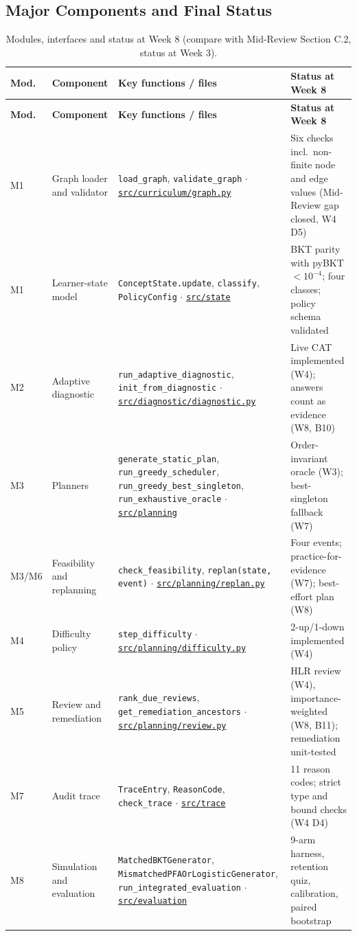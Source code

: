 \documentclass[english]{sintr}
\newcommand{\repourl}{https://github.com/Bhuvan-56/adaptive-learning-path-planner-DAT}
\newcommand{\sha}{cs5903-final-2026}
\DeclareRobustCommand{\rf}[1]{\href{\repourl/blob/\sha/#1}{\nolinkurl{#1}}}
\DeclareRobustCommand{\rd}[1]{\href{\repourl/tree/\sha/#1}{\nolinkurl{#1}}}
\begin{document}
\subsection{Major Components and Final Status}
{\small
\begin{longtable}{|C{1.11cm}|L{2.40cm}|L{5.82cm}|L{5.26cm}|}
\caption{Modules, interfaces and status at Week 8 (compare with Mid-Review Section C.2, status at Week 3).}\\
\hline
\textbf{Mod.} & \textbf{Component} & \textbf{Key functions / files} & \textbf{Status at Week 8} \\ \hline
\endfirsthead
\hline \textbf{Mod.} & \textbf{Component} & \textbf{Key functions / files} & \textbf{Status at Week 8} \\ \hline
\endhead
M1 & Graph loader and validator & \texttt{load\_graph}, \texttt{validate\_graph} $\cdot$ \rf{src/curriculum/graph.py} & Six checks incl.\ non-finite node and edge values (Mid-Review gap closed, W4 D5) \\ \hline
M1 & Learner-state model & \texttt{ConceptState.update}, \texttt{classify}, \texttt{PolicyConfig} $\cdot$ \rd{src/state} & BKT parity with pyBKT $<10^{-4}$; four classes; policy schema validated \\ \hline
M2 & Adaptive diagnostic & \texttt{run\_adaptive\_diagnostic}, \texttt{init\_from\_diagnostic} $\cdot$ \rf{src/diagnostic/diagnostic.py} & Live CAT implemented (W4); answers count as evidence (W8, B10) \\ \hline
M3 & Planners & \texttt{generate\_static\_plan}, \texttt{run\_greedy\_scheduler}, \texttt{run\_greedy\_best\_singleton}, \texttt{run\_exhaustive\_oracle} $\cdot$ \rd{src/planning} & Order-invariant oracle (W3); best-singleton fallback (W7) \\ \hline
M3/M6 & Feasibility and replanning & \texttt{check\_feasibility}, \texttt{replan(state, event)} $\cdot$ \rf{src/planning/replan.py} & Four events; practice-for-evidence (W7); best-effort plan (W8) \\ \hline
M4 & Difficulty policy & \texttt{step\_difficulty} $\cdot$ \rf{src/planning/difficulty.py} & 2-up/1-down implemented (W4) \\ \hline
M5 & Review and remediation & \texttt{rank\_due\_reviews}, \texttt{get\_remediation\_ancestors} $\cdot$ \rf{src/planning/review.py} & HLR review (W4), importance-weighted (W8, B11); remediation unit-tested \\ \hline
M7 & Audit trace & \texttt{TraceEntry}, \texttt{ReasonCode}, \texttt{check\_trace} $\cdot$ \rd{src/trace} & 11 reason codes; strict type and bound checks (W4 D4) \\ \hline
M8 & Simulation and evaluation & \texttt{MatchedBKTGenerator}, \texttt{MismatchedPFAOrLogisticGenerator}, \texttt{run\_integrated\_evaluation} $\cdot$ \rd{src/evaluation} & 9-arm harness, retention quiz, calibration, paired bootstrap \\ \hline
\end{longtable}
}
\end{document}
